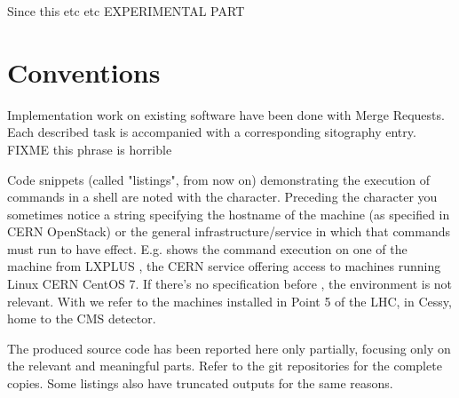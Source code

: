 Since this etc etc EXPERIMENTAL PART

\section{Conventions}

Implementation work on existing software have been done with Merge Requests. Each described task is accompanied with a corresponding sitography entry. FIXME this phrase is horrible

Code snippets (called "listings", from now on) demonstrating the execution of commands in a shell are noted with the \mcode{\$} character. Preceding the \mcode{\$} character you sometimes notice a string specifying the hostname of the machine (as specified in CERN OpenStack) or the general infrastructure/service in which that commands must run to have effect. E.g.  shows the command execution on one of the machine from LXPLUS \cite{LXPLUSServiceITDepartment-2020-10-01}, the CERN service offering access to machines running Linux CERN CentOS 7. If there's no specification before \mcode{\$}, the environment is not relevant. With  we refer to the machines installed in Point 5 of the LHC, in Cessy, home to the CMS detector.

The produced source code has been reported here only partially, focusing only on the relevant and meaningful parts. Refer to the git repositories for the complete copies. Some listings also have truncated outputs for the same reasons.